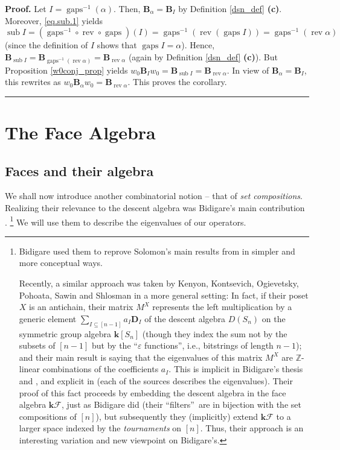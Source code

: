 \documentclass[12pt]{article}
\theoremstyle{definition}%
\theoremstyle{definition}%
\theoremstyle{remark}%
\newcommand{\tup}[1]{\left( #1 \right)}
\newcommand{\interval}[1]{\left[ #1 \right]} %
\newcommand{\ZZ}{\mathbb{Z}}
\newcommand{\kk}{\mathbf{k}}
\newcommand{\ksn}{\kk\left[S_n\right]}
\newcommand{\kf}{\kk\mathcal{F}}
\newcommand{\dsn}{D\left(S_n\right)}
\newcommand{\BB}{\mathbf{B}}
\newcommand{\BBa}{\mathbf{B}_{\alpha}}
\newcommand{\BBi}{\mathbf{B}_{I}}
\newcommand{\DD}{\mathbf{D}}
\newcommand{\wo}{w_0} %
\newcommand{\gaps}{\operatorname{gaps}}
\newcommand{\sub}{\operatorname{sub}}
\newcommand{\rev}{\operatorname{rev}}
\newenvironment{proof}[1][Proof]{\noindent\textbf{#1.} }{\ \rule{0.5em}{0.5em}}
\begin{document}
\begin{proof}
    Let $I = \gaps^{-1}\tup{\alpha}$. Then,
	$\BBa = \BBi$ by Definition \ref{dsn_def} \textbf{(c)}.
	Moreover, \eqref{eq.sub.1} yields 
	\[
	\sub I
	= \tup{\gaps^{-1} \circ \rev \circ \gaps}\tup{I}
	= \gaps^{-1}\tup{\rev \tup{\gaps I}}
	= \gaps^{-1}\tup{\rev \alpha}
	\]
	(since the definition of $I$ shows that
	$\gaps I = \alpha$).
	Hence, $\BB_{\sub I} = \BB_{\gaps^{-1}\tup{\rev \alpha}}
	= \BB_{\rev \alpha}$
	(again by Definition \ref{dsn_def} \textbf{(c)}).
	But Proposition \ref{w0conj_prop} yields
	$\wo \BBi \wo = \BB_{\sub I} = \BB_{\rev \alpha}$.
	In view of $\BBa = \BBi$, this rewrites as
	$\wo \BBa \wo = \BB_{\rev \alpha}$.
	This proves the corollary.
\end{proof}

\section{\label{sec.facealg}The Face Algebra}

\subsection{Faces and their algebra}

We shall now introduce another combinatorial notion -- that of \emph{set compositions}.
Realizing their relevance to the descent algebra was Bidigare's main contribution \cite{Bidigare-thesis}.
\footnote{Bidigare used them to reprove Solomon's main results from \cite{Sol76} in simpler and more conceptual ways. \par
Recently, a similar approach was taken by Kenyon, Kontsevich, Ogievetsky, Pohoata, Sawin and Shlosman \cite{KKOPSS24} in a more general setting:
In fact, if their poset $X$ is an antichain, their matrix $M^X$ represents the left multiplication by a generic element $\sum_{I \subseteq \interval{n-1}} a_I \DD_I$ of the descent algebra $\dsn$ on the symmetric group algebra $\ksn$ (though they index the sum not by the subsets of $[n-1]$ but by the ``$\varepsilon$ functions'', i.e., bitstrings of length $n-1$); and their main result \cite[Theorem 1]{KKOPSS24} is saying that the eigenvalues of this matrix $M^X$ are $\ZZ$-linear combinations of the coefficients $a_I$.
This is implicit in Bidigare's thesis \cite{Bidigare-thesis} and \cite[Theorem 4.1]{Schocker}, and explicit in \cite[Proposition 3.12]{ncsf2} (each of the sources describes the eigenvalues).
Their proof of this fact proceeds by embedding the descent algebra in the face algebra $\kf$, just as Bidigare did (their ``filters''\ are in bijection with the set compositions of $\interval{n}$), but subsequently they (implicitly) extend $\kf$ to a larger space indexed by the \emph{tournaments} on $\interval{n}$.
Thus, their approach is an interesting variation and new viewpoint on Bidigare's. }
We will use them to describe the eigenvalues of our operators.
\end{document}
